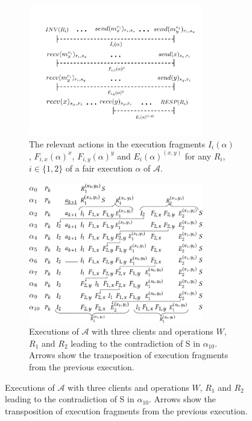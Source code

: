 
\begin{figure}[t]
	\hspace*{-0.0cm}
	\begin{subfigure}{0.49\textwidth}
		\centering
	     \includegraphics[width=3.0in]{figures/executions_3_2.pdf}
	     \caption{\small{
	      The relevant actions in the execution fragments $I_i(\alpha)$, $F_{i,x}(\alpha)^{x}$,    $F_{i,y}(\alpha)^{y}$ and   $E_{i}(\alpha)^{(x,y)}$ for any \rot{} $R_i$, $i \in \{1, 2\}$
			of a fair execution $\alpha$ of $\mathcal{A}$.
	     }}
	     \label{fig:exe3_fragments}
	\end{subfigure}
	\hspace*{0.0cm}  
	\begin{subfigure}{0.49\textwidth}
		\centering
		\includegraphics[width=3.0in]{figures/executions_3_1-cropa.pdf}		
		\caption{\small{Executions of $\mathcal{A}$ with three clients and operations $W$, $R_1$ and $R_2$ leading to the contradiction of S in $\alpha_{10}$.
			Arrows show the transposition of execution fragments from the previous execution.
		}}
           	\label{fig:executions3}
	\end{subfigure}   	
\end{figure}
